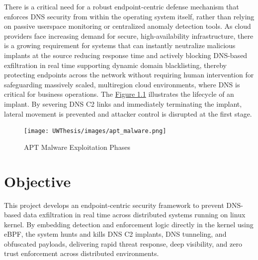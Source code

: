 \documentclass [11pt, proquest] {uwthesis}[2020/02/24]
\begin{document}
There is a critical need for a robust endpoint-centric defense mechanism that enforces DNS security from within the operating system itself, rather than relying on passive userspace monitoring or centralized anomaly detection tools. As cloud providers face increasing demand for secure, high-availability infrastructure, there is a growing requirement for systems that can instantly neutralize malicious implants at the source reducing response time and actively blocking DNS-based exfiltration in real time supporting dynamic domain blacklisting, thereby protecting endpoints across the network without requiring human intervention for safeguarding massively scaled, multiregion cloud environments, where DNS is critical for business operations.
The \hyperref[sec:apt_malware_flow]{Figure 1.1} illustrates the lifecycle of an implant. By severing DNS C2 links and immediately terminating the implant, lateral movement is prevented and attacker control is disrupted at the first stage.
\begin{figure}[H]
\texttt{[image: UWThesis/images/apt\_malware.png]}
\caption{APT Malware Exploitation Phases}
\label{sec:apt_malware_flow}
\end{figure}

\section{Objective}
This project develops an endpoint-centric security framework to prevent DNS-based data exfiltration in real time across distributed systems running on linux kernel. By embedding detection and enforcement logic directly in the kernel using eBPF, the system hunts and kills DNS C2 implants, DNS tunneling, and obfuscated payloads, delivering rapid threat response, deep visibility, and zero trust enforcement across distributed environments.
\end{document}
